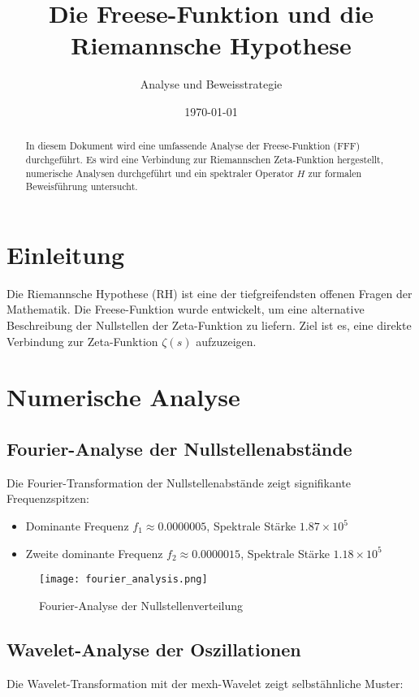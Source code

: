 \documentclass[a4paper,12pt]{article}
\title{Die Freese-Funktion und die Riemannsche Hypothese}
\author{Analyse und Beweisstrategie}
\date{\today}
\begin{document}
\maketitle

\begin{abstract}
In diesem Dokument wird eine umfassende Analyse der Freese-Funktion (FFF) durchgeführt. Es wird eine Verbindung zur Riemannschen Zeta-Funktion hergestellt, numerische Analysen durchgeführt und ein spektraler Operator \( H \) zur formalen Beweisführung untersucht.
\end{abstract}

\section{Einleitung}
Die Riemannsche Hypothese (RH) ist eine der tiefgreifendsten offenen Fragen der Mathematik. Die Freese-Funktion wurde entwickelt, um eine alternative Beschreibung der Nullstellen der Zeta-Funktion zu liefern. Ziel ist es, eine direkte Verbindung zur Zeta-Funktion \(\zeta(s)\) aufzuzeigen.

\section{Numerische Analyse}

\subsection{Fourier-Analyse der Nullstellenabstände}
Die Fourier-Transformation der Nullstellenabstände zeigt signifikante Frequenzspitzen:

\begin{itemize}
    \item Dominante Frequenz \( f_1 \approx 0.0000005 \), Spektrale Stärke \( 1.87 \times 10^5 \)
    \item Zweite dominante Frequenz \( f_2 \approx 0.0000015 \), Spektrale Stärke \( 1.18 \times 10^5 \)
\end{itemize}

\begin{figure}[h]
    \centering
    \texttt{[image: fourier\_analysis.png]}
    \caption{Fourier-Analyse der Nullstellenverteilung}
\end{figure}

\subsection{Wavelet-Analyse der Oszillationen}
Die Wavelet-Transformation mit der mexh-Wavelet zeigt selbstähnliche Muster:
\end{document}
